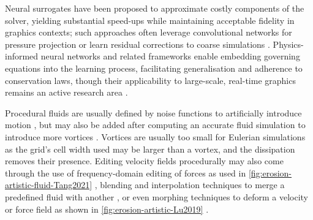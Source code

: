 Neural surrogates have been proposed to approximate costly components of the solver, yielding substantial speed-ups while maintaining acceptable fidelity in graphics contexts; such approaches often leverage convolutional networks for pressure projection or learn residual corrections to coarse simulations \cite{Tompson2017,Sousa2024}. Physics-informed neural networks and related frameworks enable embedding governing equations into the learning process, facilitating generalisation and adherence to conservation laws, though their applicability to large-scale, real-time graphics remains an active research area \cite{Brunton2025}.


Procedural fluids are usually defined by noise functions to artificially introduce motion \cite{Bridson2007c}, but may also be added after computing an accurate fluid simulation to introduce more vortices \cite{Wang2025}. Vortices are usually too small for Eulerian simulations as the grid's cell width used may be larger than a vortex, and the dissipation removes their presence. Editing velocity fields procedurally may also come through the use of frequency-domain editing of forces as used in \cref{fig:erosion-artistic-fluid-Tang2021} \cite{Forootaninia2020, Tang2021}, blending and interpolation techniques to merge a predefined fluid with another \cite{Raveendran2014}, or even morphing techniques to deform a velocity or force field as shown in \cref{fig:erosion-artistic-Lu2019} \cite{Lu2019,Raveendran2012,Flynn2019}.

